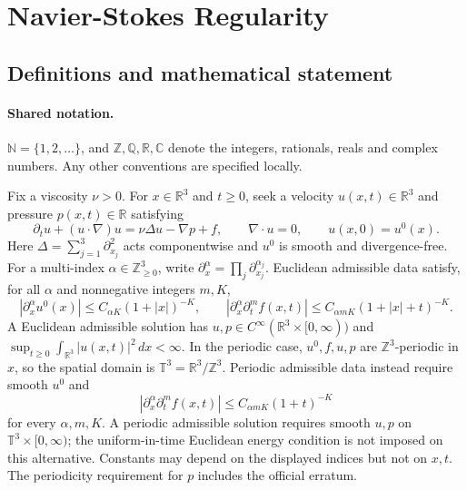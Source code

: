 \documentclass[11pt]{article}
\begin{document}
\section{Navier-Stokes Regularity}\label{statement}

\subsection{Definitions and mathematical statement}

\paragraph{Shared notation.}$\mathbb N=\{1,2,\ldots\}$, and $\mathbb Z,\mathbb Q,\mathbb R,\mathbb C$ denote the integers, rationals, reals and complex numbers. Any other conventions are specified locally.


Fix a viscosity $\nu>0$. For $x\in\mathbb R^3$ and $t\geq0$, seek a velocity $u(x,t)\in\mathbb R^3$ and pressure $p(x,t)\in\mathbb R$ satisfying
\[
\partial_tu+(u\cdot\nabla)u=\nu\Delta u-\nabla p+f,\qquad \nabla\cdot u=0,\qquad u(x,0)=u^0(x).
\]
Here $\Delta=\sum_{j=1}^3\partial_{x_j}^2$ acts componentwise and $u^0$ is smooth and divergence-free. For a multi-index $\alpha\in\mathbb Z_{\geq0}^3$, write $\partial_x^\alpha=\prod_j\partial_{x_j}^{\alpha_j}$. Euclidean admissible data satisfy, for all $\alpha$ and nonnegative integers $m,K$,
\[
|\partial_x^\alpha u^0(x)|\leq C_{\alpha K}(1+|x|)^{-K},\qquad
|\partial_x^\alpha\partial_t^mf(x,t)|\leq C_{\alpha mK}(1+|x|+t)^{-K}.
\]
A Euclidean admissible solution has $u,p\in C^\infty(\mathbb R^3\times[0,\infty))$ and $\sup_{t\geq0}\int_{\mathbb R^3}|u(x,t)|^2\,dx<\infty$. In the periodic case, $u^0,f,u,p$ are $\mathbb Z^3$-periodic in $x$, so the spatial domain is $\mathbb T^3=\mathbb R^3/\mathbb Z^3$. Periodic admissible data instead require smooth $u^0$ and
\[
|\partial_x^\alpha\partial_t^mf(x,t)|\leq C_{\alpha mK}(1+t)^{-K}
\]
for every $\alpha,m,K$. A periodic admissible solution requires smooth $u,p$ on $\mathbb T^3\times[0,\infty)$; the uniform-in-time Euclidean energy condition is not imposed on this alternative. Constants may depend on the displayed indices but not on $x,t$. The periodicity requirement for $p$ includes the official erratum.
\end{document}
